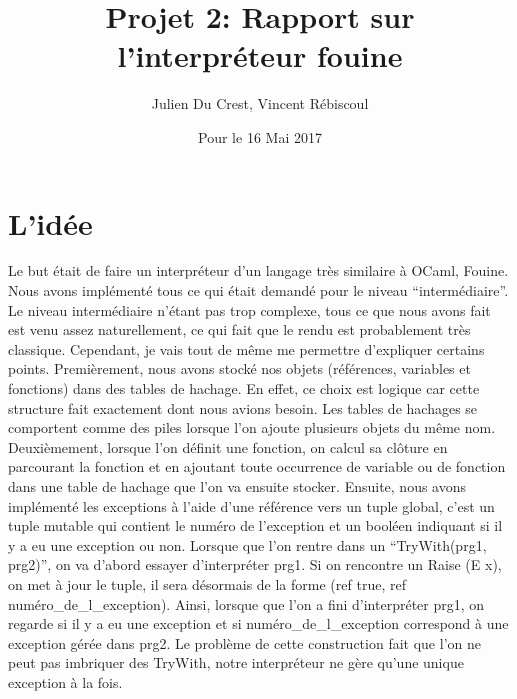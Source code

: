 \documentclass[10pt,a4paper]{article}
\title{Projet 2: Rapport sur l'interpréteur fouine}
\author{Julien Du Crest, Vincent Rébiscoul}
\date{Pour le 16 Mai 2017}
\begin{document}
\maketitle

\section{L'idée}
Le but était de faire un interpréteur d'un langage très similaire à OCaml, Fouine. Nous avons implémenté tous ce qui était demandé pour le niveau ``intermédiaire''. Le niveau intermédiaire n'étant pas trop complexe, tous ce que nous avons fait est venu assez naturellement, ce qui fait que le rendu est probablement très classique. Cependant, je vais tout de même me permettre d'expliquer certains points. Premièrement, nous avons stocké nos objets (références, variables et fonctions) dans des tables de hachage. En effet, ce choix est logique car cette structure fait exactement dont nous avions besoin. Les tables de hachages se comportent comme des piles lorsque l'on ajoute plusieurs objets du même nom. Deuxièmement, lorsque l'on définit une fonction, on calcul sa clôture en parcourant la fonction et en ajoutant toute occurrence de variable ou de fonction dans une table de hachage que l'on va ensuite stocker. Ensuite, nous avons implémenté les exceptions à l'aide d'une référence vers un tuple global, c'est un tuple mutable qui contient le numéro de l'exception et un booléen indiquant si il y a eu une exception ou non. Lorsque que l'on rentre dans un ``TryWith(prg1, prg2)'', on va d'abord essayer d'interpréter prg1. Si on rencontre un Raise (E x), on met à jour le tuple, il sera désormais de la forme (ref true, ref numéro\_de\_l\_exception). Ainsi, lorsque que l'on a fini d'interpréter prg1, on regarde si il y a eu une exception et si numéro\_de\_l\_exception correspond à une exception gérée dans prg2. Le problème de cette construction fait que l'on ne peut pas imbriquer des TryWith, notre interpréteur ne gère qu'une unique exception à la fois. 
\end{document}
